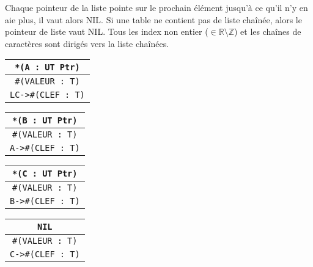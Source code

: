 \documentclass{article}
\begin{document}
 Chaque pointeur de la liste pointe sur le prochain élément jusqu'à ce qu'il n'y en aie plus, il vaut alors NIL. Si une table ne contient pas de liste chaînée, alors le pointeur de liste vaut NIL. Tous les index non entier ($\in\mathbb{R}\setminus\mathbb{Z}$) et les chaînes de caractères sont dirigés vers la liste chaînées.
\begin{center}
  \begin{tabular}{|c|}
    \hline
    \texttt{*(A : UT Ptr)}\\
    \hline
    \texttt{\#{}(VALEUR : T)}\\
    \hline
    \texttt{LC->\#{}(CLEF : T)}\\
    \hline
  \end{tabular}
  \begin{tabular}{|c|}
    \hline
    \texttt{*(B : UT Ptr)}\\
    \hline
    \texttt{\#{}(VALEUR : T)}\\
    \hline
    \texttt{A->\#{}(CLEF : T)}\\
    \hline
  \end{tabular}
  \begin{tabular}{|c|}
    \hline
    \texttt{*(C : UT Ptr)}\\
    \hline
    \texttt{\#{}(VALEUR : T)}\\
    \hline
    \texttt{B->\#{}(CLEF : T)}\\
    \hline
  \end{tabular}
  \begin{tabular}{|c|}
    \hline
    \texttt{NIL}\\
    \hline
    \texttt{\#{}(VALEUR : T)}\\
    \hline
    \texttt{C->\#{}(CLEF : T)}\\
    \hline
  \end{tabular}
\end{center}
\end{document}
